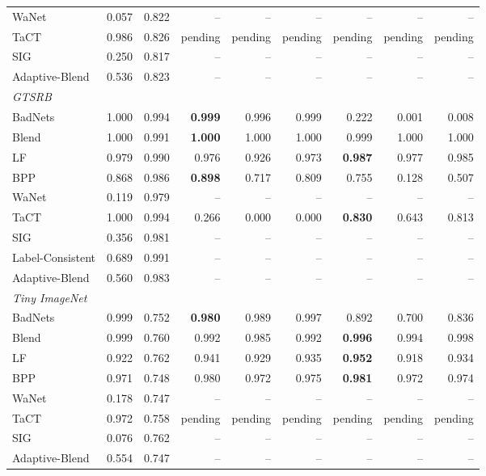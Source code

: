 \begin{table}[htbp]
\begin{tabular}{lrrrrrrrr}
WaNet & 0.057 & 0.822 & -- & -- & -- & -- & -- & -- \\
TaCT & 0.986 & 0.826 & pending & pending & pending & pending & pending & pending \\
SIG & 0.250 & 0.817 & -- & -- & -- & -- & -- & -- \\
Adaptive-Blend & 0.536 & 0.823 & -- & -- & -- & -- & -- & -- \\
\midrule
\multicolumn{9}{l}{\textit{GTSRB}} \\
BadNets & 1.000 & 0.994 & \textbf{0.999} & 0.996 & 0.999 & 0.222 & 0.001 & 0.008 \\
Blend & 1.000 & 0.991 & \textbf{1.000} & 1.000 & 1.000 & 0.999 & 1.000 & 1.000 \\
LF & 0.979 & 0.990 & 0.976 & 0.926 & 0.973 & \textbf{0.987} & 0.977 & 0.985 \\
BPP & 0.868 & 0.986 & \textbf{0.898} & 0.717 & 0.809 & 0.755 & 0.128 & 0.507 \\
WaNet & 0.119 & 0.979 & -- & -- & -- & -- & -- & -- \\
TaCT & 1.000 & 0.994 & 0.266 & 0.000 & 0.000 & \textbf{0.830} & 0.643 & 0.813 \\
SIG & 0.356 & 0.981 & -- & -- & -- & -- & -- & -- \\
Label-Consistent & 0.689 & 0.991 & -- & -- & -- & -- & -- & -- \\
Adaptive-Blend & 0.560 & 0.983 & -- & -- & -- & -- & -- & -- \\
\midrule
\multicolumn{9}{l}{\textit{Tiny ImageNet}} \\
BadNets & 0.999 & 0.752 & \textbf{0.980} & 0.989 & 0.997 & 0.892 & 0.700 & 0.836 \\
Blend & 0.999 & 0.760 & 0.992 & 0.985 & 0.992 & \textbf{0.996} & 0.994 & 0.998 \\
LF & 0.922 & 0.762 & 0.941 & 0.929 & 0.935 & \textbf{0.952} & 0.918 & 0.934 \\
BPP & 0.971 & 0.748 & 0.980 & 0.972 & 0.975 & \textbf{0.981} & 0.972 & 0.974 \\
WaNet & 0.178 & 0.747 & -- & -- & -- & -- & -- & -- \\
TaCT & 0.972 & 0.758 & pending & pending & pending & pending & pending & pending \\
SIG & 0.076 & 0.762 & -- & -- & -- & -- & -- & -- \\
Adaptive-Blend & 0.554 & 0.747 & -- & -- & -- & -- & -- & -- \\
\bottomrule
\end{tabular}
\end{table}
